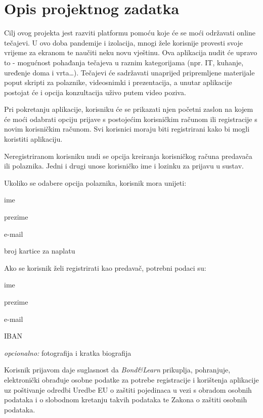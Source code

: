 \chapter{Opis projektnog zadatka}
		
		\text Cilj ovog projekta jest razviti platformu pomoću koje će se moći održavati online tečajevi. U ovo doba pandemije i izolacija, mnogi žele korisnije provesti svoje vrijeme za ekranom te naučiti neku novu vještinu. Ova aplikacija nudit će upravo to - mogućnost pohađanja tečajeva u raznim kategorijama (npr. IT, kuhanje, uređenje doma i vrta…). Tečajevi će sadržavati unaprijed pripremljene materijale poput skripti za polaznike, videosnimki i prezentacija, a unutar aplikacije postojat će i opcija konzultacija uživo putem video poziva.
		
		Pri pokretanju aplikacije, korisniku će se prikazati njen početni zaslon na kojem će moći odabrati opciju prijave s postojećim korisničkim računom ili registracije s novim korisničkim računom. Svi korisnici moraju biti registrirani kako bi mogli koristiti aplikaciju. 
		
		Neregistriranom korisniku nudi se opcija kreiranja korisničkog računa predavača ili polaznika. Jedni i drugi unose korisničko ime i lozinku za prijavu u sustav.
		
		Ukoliko se odabere opcija polaznika, korisnik mora unijeti:
		\begin{packed_item}
			\item ime
			\item prezime
			\item e-mail
			\item broj kartice za naplatu
		\end{packed_item}
	
	Ako se korisnik želi registrirati kao predavač, potrebni podaci su:
		\begin{packed_item}
			\item ime
			\item prezime
			\item e-mail
			\item IBAN
			\item \textit{opcionalno:} fotografija i kratka biografija
		\end{packed_item}
	Korisnik prijavom daje suglasnost da \textit{Bond\&Learn} prikuplja, pohranjuje, elektronički obrađuje osobne podatke za potrebe registracije i korištenja aplikacije uz poštivanje odredbi Uredbe EU o zaštiti pojedinaca u vezi s obradom osobnih podataka i o slobodnom kretanju takvih podataka te Zakona o zaštiti osobnih podataka.
	
